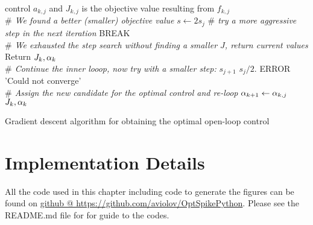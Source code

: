 \begin{algorithm}
\begin{algorithmic}
{	control $a_{k,j}$ and $J_{k,j}$ is the objective value resulting from
	$f_{k,j}$}
		\\ {\itshape $\#$ We found a better (smaller) objective value}
		\State $s \gets 2 s_j$ {\itshape $\#$ try a more aggressive step in the
		next iteration}
		\State BREAK
		\EndIf
		\\ {\itshape $\#$ We exhausted the step search without finding a 
		smaller $J$, return current values}
		\State Return $J_k, \alpha_k$
	\EndIf
 	\\ {\itshape  $ \#$ Continue the inner looop, now try with a smaller step:}
	 	\State $s_{j+1}$ \gets $s_j / 2.$
		\State ERROR 'Could not converge'
	\EndIf
    \\{\itshape $\#$ Assign the new candidate for the optimal control and
    re-loop}
		\State $\alpha_{k+1} \gets \alpha_{k,j}$
\State \Return $J_k, \alpha_k$
\end{algorithmic}
\caption{ Gradient descent algorithm for obtaining the optimal open-loop 
control}
\label{alg:gradient_descent_4_OC}
\end{algorithm}


\section*{Implementation Details}
All the code used in this chapter including code to generate the figures
can be found on
\href{https://github.com/aviolov/OptSpikePython}{github @
https://github.com/aviolov/OptSpikePython}. Please see the README.md file for
for guide to the codes.

